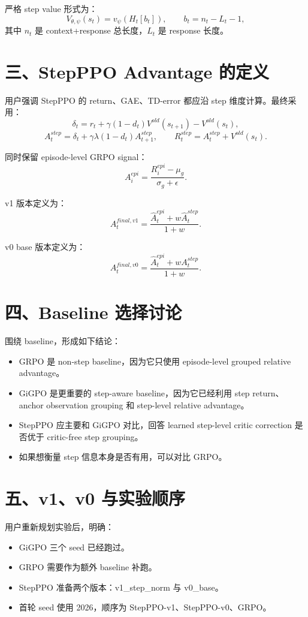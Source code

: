 \documentclass[10pt]{ctexart}
\begin{document}
严格 step value 形式为：
\[
V_{\theta,\psi}(s_t)=v_\psi(H_t[b_t]),
\qquad b_t=n_t-L_t-1,
\]
其中 $n_t$ 是 context+response 总长度，$L_t$ 是 response 长度。

\section*{三、StepPPO Advantage 的定义}
用户强调 StepPPO 的 return、GAE、TD-error 都应沿 step 维度计算。最终采用：
\[
\delta_t=r_t+\gamma(1-d_t)V^{old}(s_{t+1})-V^{old}(s_t),
\]
\[
A_t^{step}=\delta_t+\gamma\lambda(1-d_t)A_{t+1}^{step},
\qquad
R_t^{step}=A_t^{step}+V^{old}(s_t).
\]

同时保留 episode-level GRPO signal：
\[
A_i^{epi}=\frac{R_i^{epi}-\mu_g}{\sigma_g+\epsilon}.
\]

v1 版本定义为：
\[
A_t^{final,v1}=\frac{\widehat A_t^{epi}+w\widehat A_t^{step}}{1+w}.
\]

v0 base 版本定义为：
\[
A_t^{final,v0}=\frac{\widehat A_t^{epi}+wA_t^{step}}{1+w}.
\]

\section*{四、Baseline 选择讨论}
围绕 baseline，形成如下结论：
\begin{itemize}
\item GRPO 是 non-step baseline，因为它只使用 episode-level grouped relative advantage。
\item GiGPO 是更重要的 step-aware baseline，因为它已经利用 step return、anchor observation grouping 和 step-level relative advantage。
\item StepPPO 应主要和 GiGPO 对比，回答 learned step-level critic correction 是否优于 critic-free step grouping。
\item 如果想衡量 step 信息本身是否有用，可以对比 GRPO。
\end{itemize}

\section*{五、v1、v0 与实验顺序}
用户重新规划实验后，明确：
\begin{itemize}
\item GiGPO 三个 seed 已经跑过。
\item GRPO 需要作为额外 baseline 补跑。
\item StepPPO 准备两个版本：v1\_step\_norm 与 v0\_base。
\item 首轮 seed 使用 2026，顺序为 StepPPO-v1、StepPPO-v0、GRPO。
\end{itemize}
\end{document}
